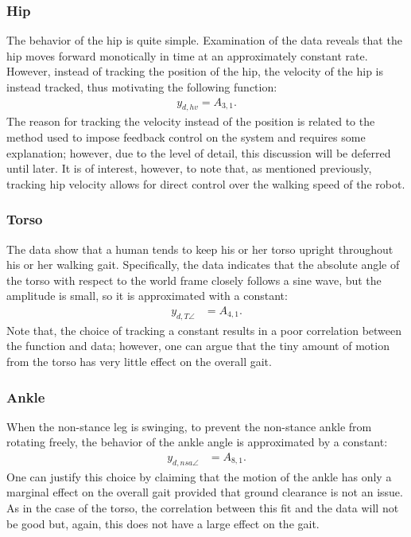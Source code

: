 \subsubsection{Hip} The behavior of the hip is quite simple. Examination of the data reveals that the hip moves forward monotically in time at an approximately constant rate. However, instead of tracking the position of the hip, the velocity of the hip is instead tracked, thus motivating the following function:
\begin{align*}
  y_{d,hv} = A_{3,1}.
\end{align*}
The reason for tracking the velocity instead of the position is related to the method used to impose feedback control on the system and requires some explanation; however, due to the level of detail, this discussion will be deferred until later. It is of interest, however, to note that, as mentioned previously, tracking hip velocity allows for direct control over the walking speed of the robot.

\subsubsection{Torso} The data show that a human tends to keep his or her torso upright throughout his or her walking gait. Specifically, the data indicates that the absolute angle of the torso with respect to the world frame closely follows a sine wave, but the amplitude is small, so it is approximated with a constant:
\begin{align*}
  y_{d,T\angle} &= A_{4,1}.
\end{align*}
Note that, the choice of tracking a constant results in a poor correlation between the function and data; however, one can argue that the tiny amount of motion from the torso has very little effect on the overall gait.

\subsubsection{Ankle} When the non-stance leg is swinging, to prevent the non-stance ankle from rotating freely, the behavior of the ankle angle is approximated by a constant:
\begin{align*}
  y_{d,nsa\angle} &= A_{8,1}.
\end{align*}
One can justify this choice by claiming that the motion of the ankle has only a marginal effect on the overall gait provided that ground clearance is not an issue. As in the case of the torso, the correlation between this fit and the data will not be good but, again, this does not have a large effect on the gait.

